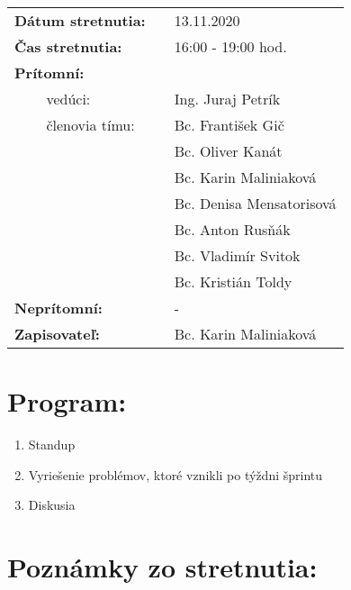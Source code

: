 \documentclass{article}
\begin{document}
    

    \begin{table}[h]
        \begin{tabular}{lllll}
            \multicolumn{3}{l}{\textbf{Dátum stretnutia:}} & & 13.11.2020 \\
            \multicolumn{3}{l}{\textbf{Čas stretnutia:}} & & 16:00 - 19:00 hod. \\
            \multicolumn{3}{l}{\textbf{Prítomní:}} \\
            & & vedúci: & & Ing. Juraj Petrík \\
            & & členovia tímu: & & Bc. František Gič  \\
            & & & & Bc. Oliver Kanát \\
            & & & & Bc. Karin Maliniaková \\
            & & & & Bc. Denisa Mensatorisová \\
            & & & & Bc. Anton Rusňák \\
            & & & & Bc. Vladimír Svitok \\
            & & & & Bc. Kristián Toldy \\
            \multicolumn{3}{l}{\textbf{Neprítomní:}} & & -\\
            \multicolumn{3}{l}{\textbf{Zapisovateľ:}} & & Bc. Karin Maliniaková \\
        \end{tabular}
        \label{tab:grades}
    \end{table}

    \section*{Program:}
    
    \begin{enumerate}
        \item Standup
        \item Vyriešenie problémov, ktoré vznikli po týždni šprintu
        \item Diskusia
    \end{enumerate}

    \section*{Poznámky zo stretnutia:}
\end{document}
